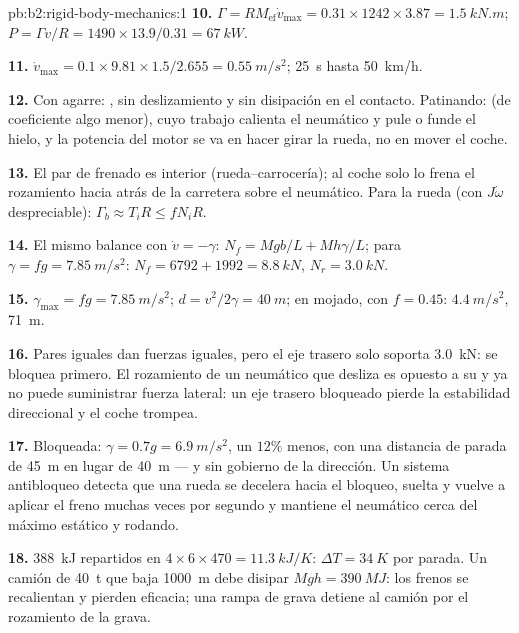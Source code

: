 \begin{solution}{pb:b2:rigid-body-mechanics:1}
\textbf{10.} $\Gamma = RM_{\text{ef}}\dot v_{\max} = 0.31 \times 1242 \times 3.87 =
\qty{1.5}{kN.m}$; $P = \Gamma v/R = 1490 \times 13.9/0.31 = \qty{67}{kW}$.

\textbf{11.} $\dot v_{\max} = 0.1 \times 9.81 \times 1.5/2.655 = \qty{0.55}{m/s^2}$;
\qty{25}{s} hasta \qty{50}{km/h}.

\textbf{12.} Con agarre: , sin deslizamiento y sin
disipación en el contacto. Patinando:  (de coeficiente
algo menor), cuyo trabajo calienta el neumático y pule o funde el hielo, y
la potencia del motor se va en hacer girar la rueda, no en mover el coche.

\textbf{13.} El par de frenado es interior (rueda--carrocería); al coche
solo lo frena el rozamiento hacia atrás de la carretera sobre el neumático.
Para la rueda (con $J\dot\omega$ despreciable): $\Gamma_b \approx T_iR \le fN_iR$.

\textbf{14.} El mismo balance con $\dot v = -\gamma$: $N_f = Mgb/L + Mh\gamma/L$;
para $\gamma = fg = \qty{7.85}{m/s^2}$: $N_f = 6792 + 1992 = \qty{8.8}{kN}$, $N_r =
\qty{3.0}{kN}$.

\textbf{15.} $\gamma_{\max} = fg = \qty{7.85}{m/s^2}$; $d = v^2/2\gamma = \qty{40}{m}$;
en mojado, con $f = 0.45$: $\qty{4.4}{m/s^2}$, \qty{71}{m}.

\textbf{16.} Pares iguales dan fuerzas iguales, pero el eje trasero solo
soporta \qty{3.0}{kN}: se bloquea primero. El rozamiento de un neumático que
desliza es opuesto a su  y ya no puede suministrar
fuerza lateral: un eje trasero bloqueado pierde la estabilidad direccional
y el coche trompea.

\textbf{17.} Bloqueada: $\gamma = 0.7g = \qty{6.9}{m/s^2}$, un $12\%$ menos,
con una distancia de parada de \qty{45}{m} en lugar de \qty{40}{m} --- y sin
gobierno de la dirección. Un sistema antibloqueo detecta que una rueda se
decelera hacia el bloqueo, suelta y vuelve a aplicar el freno muchas veces
por segundo y mantiene el neumático cerca del máximo estático y rodando.

\textbf{18.} \qty{388}{kJ} repartidos en $4 \times 6 \times 470 = \qty{11.3}{kJ/K}$: $\Delta T =
\qty{34}{K}$ por parada. Un camión de \qty{40}{t} que baja \qty{1000}{m} debe disipar
$Mgh = \qty{390}{MJ}$: los frenos se recalientan y pierden eficacia; una
rampa de grava detiene al camión por el rozamiento de la grava.


\end{solution}
